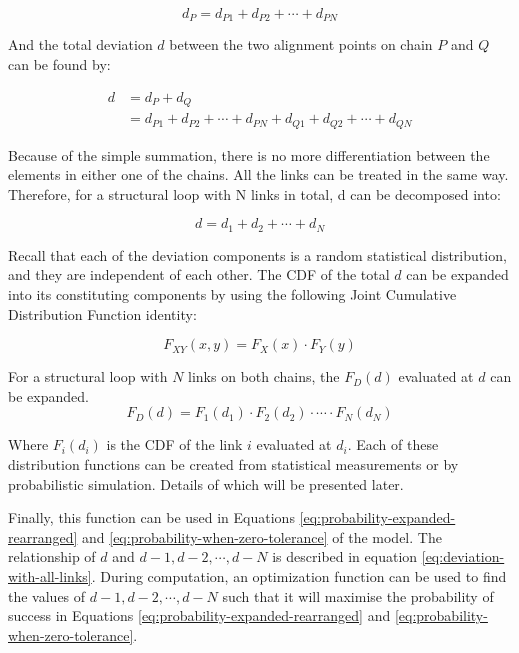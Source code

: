 \begin{equation}
    d_P = d_{P1} + d_{P2} + \cdots + d_{PN}
\end{equation}

And the total deviation $d$ between the two alignment points on chain $P$ and $Q$ can be found by:

\begin{align} \label{eq:deviation-with-two-links}
    d &= d_P + d_Q \nonumber\\
      &= d_{P1} + d_{P2} + \cdots + d_{PN} + d_{Q1} + d_{Q2} + \cdots + d_{QN}
\end{align}

Because of the simple summation, there is no more differentiation between the elements in either one of the chains. All the links can be treated in the same way. Therefore, for a structural loop with N links in total, d can be decomposed into:

\begin{equation} \label{eq:deviation-with-all-links}
    d = d_1 + d_2 + \cdots + d_N
\end{equation}

Recall that each of the deviation components is a random statistical distribution, and they are independent of each other. The CDF of the total $d$ can be expanded into its constituting components by using the following Joint Cumulative Distribution Function identity:

\begin{equation}
    F_{XY}(x,y) = F_X(x) \cdot F_Y(y)
\end{equation}

For a structural loop with $N$ links on both chains, the $F_D(d)$ evaluated at $d$ can be expanded.
\begin{equation}  \label{eq:probability-with-all-links}
    F_D(d) = F_1(d_1) \cdot F_2(d_2) \cdot \cdots \cdot F_N(d_N)
\end{equation}

Where $F_i(d_i)$ is the CDF of the link $i$ evaluated at $d_i$. Each of these distribution functions can be created from statistical measurements or by probabilistic simulation. Details of which will be presented later.

Finally, this function can be used in Equations \ref{eq:probability-expanded-rearranged} and \ref{eq:probability-when-zero-tolerance} of the model. The relationship of $d$ and $d-1, d-2, \cdots , d-N$ is described in equation \ref{eq:deviation-with-all-links}. During computation, an optimization function can be used to find the values of $d-1, d-2, \cdots , d-N$ such that it will maximise the probability of success in Equations \ref{eq:probability-expanded-rearranged} and \ref{eq:probability-when-zero-tolerance}.

